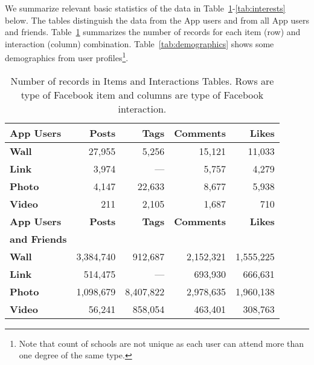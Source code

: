 We summarize relevant basic statistics of the data in Table~\ref{tab:interactions}-\ref{tab:interests} below.
The tables distinguish the data from the App users and from
all App users and friends. Table~\ref{tab:interactions}
summarizes the number of records for each item (row) and interaction (column)
combination. Table~\ref{tab:demographics} shows 
some demographics from user profiles\footnote{Note that
count of schools are not unique as each user can attend more than one
degree of the same type.}.

\begin{table}
\centering
\begin{tabular}{|>{\small}l|>{\small}r|>{\small}r|>{\small}r|>{\small}r|}
\hline
\textbf{App Users} & \textbf{Posts} & \textbf{Tags} & \textbf{Comments} & \textbf{Likes} \\
\hline
\textbf{Wall} & 27,955 & 5,256 & 15,121 & 11,033 \\
\hline
\textbf{Link} & 3,974 & --- & 5,757 & 4,279 \\
\hline
\textbf{Photo} & 4,147 & 22,633 & 8,677 & 5,938 \\
\hline
\textbf{Video} & 211 & 2,105 & 1,687 & 710 \\
\hline
\hline
\textbf{App Users} & \textbf{Posts} & \textbf{Tags} & \textbf{Comments} & \textbf{Likes} \\
\textbf{and Friends} & & & & \\
\hline
\textbf{Wall} & 3,384,740 & 912,687 & 2,152,321 & 1,555,225 \\
\hline
\textbf{Link} & 514,475 & --- & 693,930 & 666,631 \\
\hline
\textbf{Photo} & 1,098,679 & 8,407,822 & 2,978,635 & 1,960,138 \\
\hline
\textbf{Video} & 56,241 & 858,054 & 463,401 & 308,763 \\
\hline
\end{tabular}
\caption{Number of records in Items and Interactions Tables. Rows are type of Facebook item and columns are type of Facebook interaction.}
\label{tab:interactions}
\end{table}


